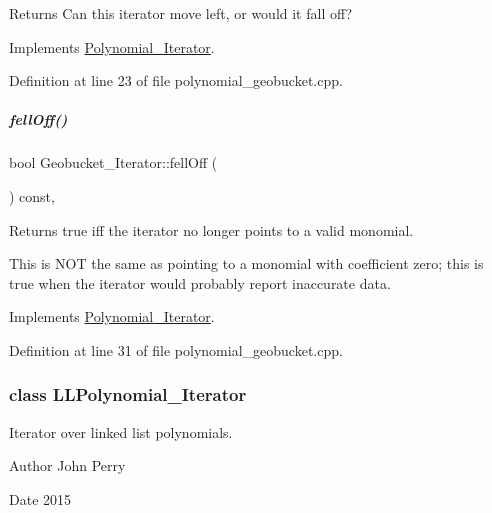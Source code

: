 \begin{DoxyReturn}{Returns}
Can this iterator move left, or would it fall off? 
\end{DoxyReturn}


Implements \hyperlink{group___iterator_group_a7ab348897446bc182500f84df8a9e590}{Polynomial\+\_\+\+Iterator}.



Definition at line 23 of file polynomial\+\_\+geobucket.\+cpp.

\mbox{\label{group___iterator_group_a44ac71c5f71fc2830c74c4d289c9aec8}} 
\subparagraph{\texorpdfstring{fell\+Off()}{fellOff()}}
{\footnotesize\ttfamily bool Geobucket\+\_\+\+Iterator\+::fell\+Off (\begin{DoxyParamCaption}{ }\end{DoxyParamCaption}) const\hspace{0.3cm}{\ttfamily [override]}, {\ttfamily [virtual]}}

\begin{DoxyReturn}{Returns}
true iff the iterator no longer points to a valid monomial.
\end{DoxyReturn}
This is N\+OT the same as pointing to a monomial with coefficient zero; this is true when the iterator would probably report inaccurate data. 

Implements \hyperlink{group___iterator_group_ac571e120134088d6067718bbad513e2d}{Polynomial\+\_\+\+Iterator}.



Definition at line 31 of file polynomial\+\_\+geobucket.\+cpp.

\label{class_l_l_polynomial___iterator}
\subsubsection{class L\+L\+Polynomial\+\_\+\+Iterator}
Iterator over linked list polynomials. 

\begin{DoxyAuthor}{Author}
John Perry 
\end{DoxyAuthor}
\begin{DoxyDate}{Date}
2015 
\end{DoxyDate}


